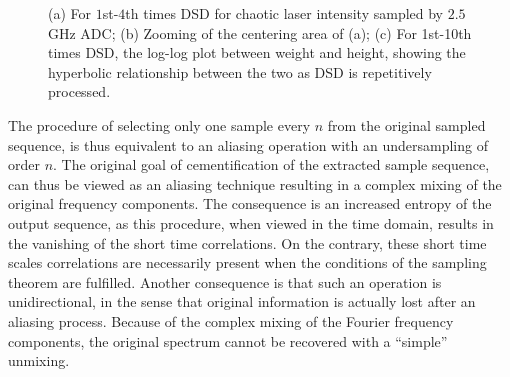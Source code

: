 \begin{figure}
  \caption{(a) For $1$st-$4$th times DSD for chaotic laser intensity
    sampled by $2.5$GHz ADC; (b) Zooming of the centering area of (a);
    (c) For 1st-10th times DSD, the log-log plot between weight and
    height, showing the hyperbolic relationship between the two as DSD
    is repetitively processed.}
  \label{diff of chaos}
\end{figure}
%
The procedure of selecting only one sample every $n$ from the original
sampled sequence, is thus equivalent to an aliasing operation with an
undersampling of order $n$. The original goal of cementification of
the extracted sample sequence, can thus be viewed as an aliasing
technique resulting in a complex mixing of the original frequency
components. The consequence is an increased entropy of the output
sequence, as this procedure, when viewed in the time domain, results
in the vanishing of the short time correlations. On the contrary,
these short time scales correlations are necessarily present when the
conditions of the sampling theorem are fulfilled. Another consequence
is that such an operation is unidirectional, in the sense that
original information is actually lost after an aliasing process.
Because of the complex mixing of the Fourier frequency components, the
original spectrum cannot be recovered with a ``simple'' unmixing.

